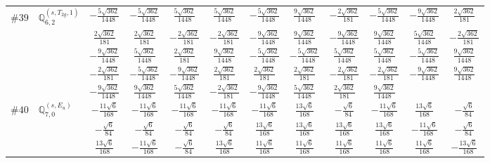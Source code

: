 \documentclass[fleqn,9pt,landscape]{jsarticle}
\begin{document}
\begin{center}
\begin{longtable}{lcccccccccc}
$ \#39\quad \mathbb{Q}_{6,2}^{(s,T_{2g},1)} $ & $ - \frac{5 \sqrt{362}}{1448} $ & $ - \frac{5 \sqrt{362}}{1448} $ & $ \frac{5 \sqrt{362}}{1448} $ & $ \frac{5 \sqrt{362}}{1448} $ & $ - \frac{5 \sqrt{362}}{1448} $ & $ \frac{9 \sqrt{362}}{1448} $ & $ - \frac{2 \sqrt{362}}{181} $ & $ - \frac{5 \sqrt{362}}{1448} $ & $ - \frac{9 \sqrt{362}}{1448} $ & $ \frac{2 \sqrt{362}}{181} $ \\
& $ \frac{2 \sqrt{362}}{181} $ & $ \frac{2 \sqrt{362}}{181} $ & $ - \frac{2 \sqrt{362}}{181} $ & $ - \frac{2 \sqrt{362}}{181} $ & $ - \frac{9 \sqrt{362}}{1448} $ & $ \frac{9 \sqrt{362}}{1448} $ & $ - \frac{9 \sqrt{362}}{1448} $ & $ \frac{9 \sqrt{362}}{1448} $ & $ \frac{5 \sqrt{362}}{1448} $ & $ - \frac{2 \sqrt{362}}{181} $ \\
& $ - \frac{9 \sqrt{362}}{1448} $ & $ \frac{5 \sqrt{362}}{1448} $ & $ \frac{2 \sqrt{362}}{181} $ & $ \frac{9 \sqrt{362}}{1448} $ & $ - \frac{5 \sqrt{362}}{1448} $ & $ - \frac{5 \sqrt{362}}{1448} $ & $ \frac{5 \sqrt{362}}{1448} $ & $ \frac{5 \sqrt{362}}{1448} $ & $ - \frac{5 \sqrt{362}}{1448} $ & $ \frac{9 \sqrt{362}}{1448} $ \\
& $ - \frac{2 \sqrt{362}}{181} $ & $ - \frac{5 \sqrt{362}}{1448} $ & $ - \frac{9 \sqrt{362}}{1448} $ & $ \frac{2 \sqrt{362}}{181} $ & $ \frac{2 \sqrt{362}}{181} $ & $ \frac{2 \sqrt{362}}{181} $ & $ - \frac{2 \sqrt{362}}{181} $ & $ - \frac{2 \sqrt{362}}{181} $ & $ - \frac{9 \sqrt{362}}{1448} $ & $ \frac{9 \sqrt{362}}{1448} $ \\
& $ - \frac{9 \sqrt{362}}{1448} $ & $ \frac{9 \sqrt{362}}{1448} $ & $ \frac{5 \sqrt{362}}{1448} $ & $ - \frac{2 \sqrt{362}}{181} $ & $ - \frac{9 \sqrt{362}}{1448} $ & $ \frac{5 \sqrt{362}}{1448} $ & $ \frac{2 \sqrt{362}}{181} $ & $ \frac{9 \sqrt{362}}{1448} $ & $  $ & $  $ \\ \hline
$ \#40\quad \mathbb{Q}_{7,0}^{(s,E_{u})} $ & $ - \frac{11 \sqrt{6}}{168} $ & $ - \frac{11 \sqrt{6}}{168} $ & $ - \frac{11 \sqrt{6}}{168} $ & $ - \frac{11 \sqrt{6}}{168} $ & $ - \frac{11 \sqrt{6}}{168} $ & $ \frac{13 \sqrt{6}}{168} $ & $ - \frac{\sqrt{6}}{84} $ & $ - \frac{11 \sqrt{6}}{168} $ & $ \frac{13 \sqrt{6}}{168} $ & $ - \frac{\sqrt{6}}{84} $ \\
& $ - \frac{\sqrt{6}}{84} $ & $ - \frac{\sqrt{6}}{84} $ & $ - \frac{\sqrt{6}}{84} $ & $ - \frac{\sqrt{6}}{84} $ & $ \frac{13 \sqrt{6}}{168} $ & $ \frac{13 \sqrt{6}}{168} $ & $ \frac{13 \sqrt{6}}{168} $ & $ \frac{13 \sqrt{6}}{168} $ & $ - \frac{11 \sqrt{6}}{168} $ & $ - \frac{\sqrt{6}}{84} $ \\
& $ \frac{13 \sqrt{6}}{168} $ & $ - \frac{11 \sqrt{6}}{168} $ & $ - \frac{\sqrt{6}}{84} $ & $ \frac{13 \sqrt{6}}{168} $ & $ \frac{11 \sqrt{6}}{168} $ & $ \frac{11 \sqrt{6}}{168} $ & $ \frac{11 \sqrt{6}}{168} $ & $ \frac{11 \sqrt{6}}{168} $ & $ \frac{11 \sqrt{6}}{168} $ & $ - \frac{13 \sqrt{6}}{168} $ \\

\end{longtable}
\end{center}
\end{document}

